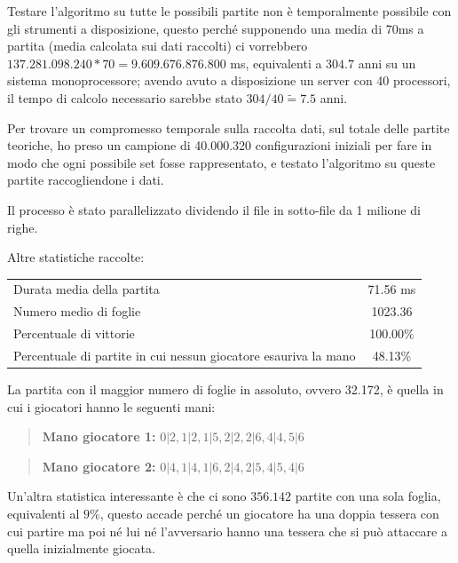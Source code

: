 \documentclass[a4paper,12pt]{report} %
\begin{document}
Testare l'algoritmo su tutte le possibili partite non è temporalmente possibile con gli strumenti a disposizione, questo perché supponendo una media di 70ms a partita (media calcolata sui dati raccolti) ci vorrebbero \(137.281.098.240 * 70  = 9.609.676.876.800\) ms, equivalenti a \(304.7\) anni su un sistema monoprocessore; avendo avuto a disposizione un server con 40 processori, il tempo di calcolo necessario sarebbe stato \(304 / 40 \tilde= 7.5\) anni. 

Per trovare un compromesso temporale sulla raccolta dati, sul totale delle partite teoriche, ho preso un campione di 40.000.320 configurazioni iniziali per fare in modo che ogni possibile set fosse rappresentato, e testato l'algoritmo su queste partite raccogliendone i dati.

Il processo è stato parallelizzato dividendo il file in sotto-file da 1 milione di righe.

\vspace{0.5cm}

Altre statistiche raccolte:

\begin{table}[h!]
    \centering
    \begin{tabular}{|l|c|}
        \hline
        Durata media della partita & 71.56 ms \\
        Numero medio di foglie & 1023.36 \\
        Percentuale di vittorie & 100.00\% \\
        Percentuale di partite in cui nessun giocatore esauriva la mano & 48.13\% \\
        \hline
    \end{tabular}
    \label{tab:global_stats}
\end{table}

La partita con il maggior numero di foglie in assoluto, ovvero 32.172, è quella in cui i giocatori hanno le seguenti mani:

\begin{quote}
    \textbf{Mano giocatore 1:} \(0|2, 1|2, 1|5, 2|2, 2|6, 4|4, 5|6\)
\end{quote}

\begin{quote}
    \textbf{Mano giocatore 2:} \(0|4, 1|4, 1|6, 2|4, 2|5, 4|5, 4|6\) 
\end{quote}



Un'altra statistica interessante è che ci sono \( 356.142 \) partite con una sola foglia, equivalenti al \( 9\%\), questo accade perché un giocatore ha una doppia tessera con cui partire ma poi né lui né l'avversario hanno una tessera che si può attaccare a quella inizialmente giocata.
\end{document}
